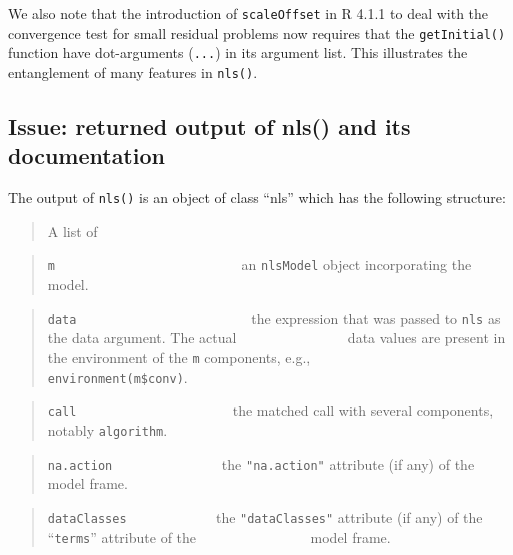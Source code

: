 \documentclass[
]{article}
\begin{document}
We also note that the introduction of \texttt{scaleOffset} in R 4.1.1 to
deal with the convergence test for small residual problems now requires
that the \texttt{getInitial()} function have dot-arguments
(\texttt{...}) in its argument list. This illustrates the entanglement
of many features in \texttt{nls()}.

\hypertarget{issue-returned-output-of-nls-and-its-documentation}{%
\subsection{Issue: returned output of nls() and its
documentation}\label{issue-returned-output-of-nls-and-its-documentation}}

The output of \texttt{nls()} is an object of class ``nls'' which has the
following structure:

\begin{quote}
A list of
\end{quote}

\begin{quote}
\texttt{m} ~ ~ ~ ~ ~ ~ ~ ~ ~ ~ ~ ~ ~ ~ ~~ an \texttt{nlsModel} object
incorporating the model.
\end{quote}

\begin{quote}
\texttt{data} ~ ~ ~ ~ ~ ~ ~ ~ ~ ~ ~ ~ ~ ~ ~the expression that was
passed to \texttt{nls} as the data argument. The actual \newline
\(~~~~~~~~~~~~~~~~~~~~~~~~~~~~~~~~~\) data values are present in the
environment of the \texttt{m} components, e.g.,
\newline \(~~~~~~~~~~~~~~~~~~~~~~~~~~~~~~~~~\)
\texttt{environment(m\$conv)}.
\end{quote}

\begin{quote}
\texttt{call} ~ ~ ~ ~ ~ ~ ~ ~ ~ ~ ~ ~ ~ the matched call with several
components, notably \texttt{algorithm}.
\end{quote}

\begin{quote}
\texttt{na.action} ~ ~ ~ ~ ~ ~ ~ ~ ~ the \texttt{"na.action"} attribute
(if any) of the model frame.
\end{quote}

\begin{quote}
\texttt{dataClasses} ~ ~ ~ ~ ~ ~ ~ \(~\)the \texttt{"dataClasses"}
attribute (if any) of the ``\texttt{terms}'' attribute of the \newline
\(~~~~~~~~~~~~~~~~~~~~~~~~~~~~~~~~~~\) model frame.
\end{quote}
\end{document}
